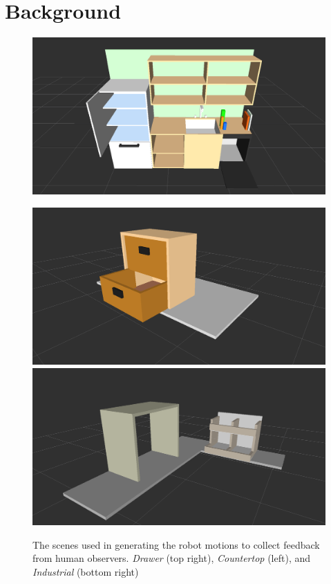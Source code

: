 \documentclass[letterpaper, 10 pt, conference]{ieeeconf}  %
\begin{document}
\section{Background}
\label{sec:background}

\begin{figure}[b]
\centering
  \includegraphics[trim = 70mm 0mm 70mm 0mm, width=0.62\columnwidth, clip=true]{pictures/countertop_scene2}
  \begin{minipage}[b][][s]{0.352\columnwidth}
  \centering
    \includegraphics[trim = 70mm 0mm 70mm 0mm, width=\textwidth, clip=true]{pictures/drawer_scene2}
    \vfill
    \includegraphics[trim = 30mm 0mm 30mm 0mm, width=\textwidth, clip=true]{pictures/industrial_scene2}
  \end{minipage}
  \hfill
\caption{The scenes used in generating the robot motions to collect feedback from human observers. \emph{Drawer} (top right), \emph{Countertop} (left), and \emph{Industrial} (bottom right)}\label{fig:scenes}
\end{figure}
\end{document}
